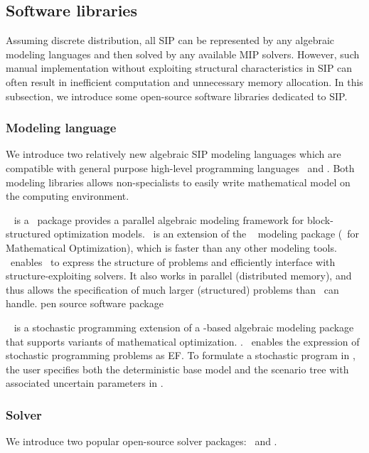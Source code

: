 \subsection{Software libraries}
Assuming discrete distribution, all SIP can be represented by any algebraic modeling languages and then solved by any available MIP solvers. However, such manual implementation without exploiting structural characteristics in SIP can often result in inefficient computation and unnecessary memory allocation. In this subsection, we introduce some open-source software libraries dedicated to SIP.

\subsubsection{Modeling language}
We introduce two relatively new algebraic SIP modeling languages which are compatible with general purpose high-level programming languages \julia\ and \python. Both modeling libraries allows non-specialists to easily write mathematical model on the computing environment.

\structjump\ \cite{web:StructJuMP} is a \julia\ package provides a parallel algebraic modeling framework for block-structured optimization models. \structjump\ is an extension of the \jump\ \cite{journal:JuMP} modeling package (\julia\ for Mathematical Optimization), which is faster than any other modeling tools. \structjump\ enables \jump\ to express the structure of problems and efficiently interface with structure-exploiting solvers. It also works in parallel (distributed memory), and thus allows the specification of much larger (structured) problems than \jump\ can handle. 
pen source software package 

\pysp\ \cite{journal:WWH2012} is a stochastic programming extension of a \python-based algebraic modeling package \pyomo\ \cite{book:pyomo} that supports variants of mathematical optimization. . \pysp\ enables the expression of stochastic programming problems as EF. To formulate a
stochastic program in \pysp, the user specifies both the deterministic base model and
the scenario tree with associated uncertain parameters in \pyomo. %

\subsubsection{Solver}
We introduce two popular open-source solver packages: \dsp\ and \pysp. 
 
